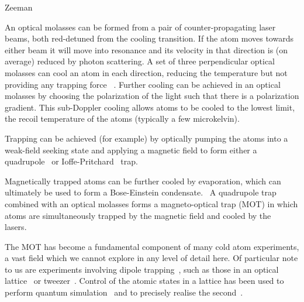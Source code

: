Zeeman 

An optical molasses can be formed from a pair of counter-propagating laser
beams, both red-detuned from the cooling transition. If the atom moves towards
either beam it will move into resonance and its velocity in that direction
is (on average) reduced by photon scattering. 
A set of three perpendicular optical molasses can cool an atom
in each direction, reducing the temperature but not providing any trapping
force~\cite{Metcalf1999} . Further cooling can be achieved in an optical
molasses by choosing the polarization of the light such that there is a
polarization gradient. This sub-Doppler cooling allows atoms to be cooled to the
lowest limit, the recoil temperature of the atoms (typically a few
microkelvin).~\cite{Dalibard:89}

Trapping can be achieved (for example) by optically pumping the atoms into a
weak-field seeking state and applying a magnetic field to form either a
quadrupole~\cite{PhysRevLett.54.2596} or
Ioffe-Pritchard~\cite{PhysRevLett.51.1336} trap.


Magnetically trapped atoms can
be further cooled by evaporation, which can ultimately be used to form a
Bose-Einstein condensate.~\cite{Anderson198} A quadrupole trap combined with an
optical molasses forms a magneto-optical trap (MOT) in which atoms are
simultaneously trapped by the magnetic field and cooled by the
lasers.~\cite{PhysRevLett.59.2631}

The MOT has become a fundamental component of many cold atom experiments, a vast
field which we cannot explore in any level of detail here. Of particular note to
us are experiments involving dipole trapping~\cite{PhysRevA.47.R4567}, such as
those in an optical lattice~\cite{Bakr2009} or tweezer~\cite{Ashkin:86}. Control
of the atomic states in a lattice has been used to perform quantum
simulation~\cite{Gross995} and to precisely realise the
second~\cite{PhysRevLett.120.103201}.

